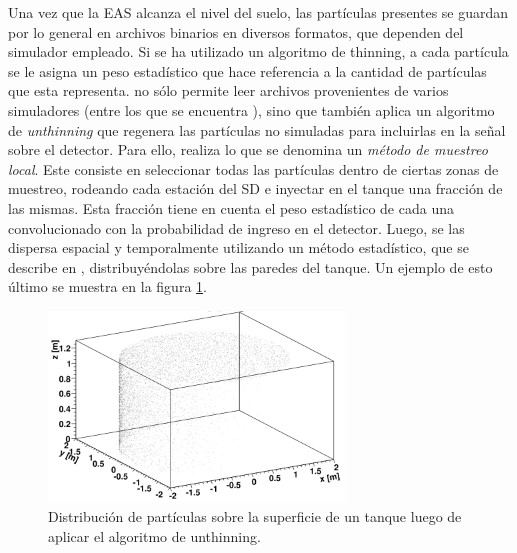		Una vez que la EAS alcanza el nivel del suelo, las part\'iculas presentes se guardan por lo general en archivos binarios en diversos formatos, que dependen del simulador empleado.
		Si se ha utilizado un algoritmo de thinning, a cada part\'icula se le asigna un peso estad\'istico que hace referencia a la cantidad de part\'iculas que esta representa.
		\Offline{} no s\'olo permite leer archivos provenientes de varios simuladores (entre los que se encuentra \aires{}), sino que tambi\'en aplica un algoritmo de \textit{unthinning} que regenera las part\'iculas no simuladas para incluirlas en la se\~nal sobre el detector.
		Para ello, realiza lo que se denomina un \textit{m\'etodo de muestreo local}.
		Este consiste en seleccionar todas las part\'iculas dentro de ciertas zonas de muestreo, rodeando cada estaci\'on del SD e inyectar en el tanque una fracci\'on de las mismas.
		Esta fracci\'on tiene en cuenta el peso estad\'istico de cada una convolucionado con la probabilidad de ingreso en el detector.
		Luego, se las dispersa espacial y temporalmente utilizando un m\'etodo estad\'istico, que se describe en \cite{unthinning1}, distribuy\'endolas sobre las paredes del tanque.
		Un ejemplo de esto \'ultimo se muestra en la figura \ref{fig:unthinning_tank}.
		\begin{figure}[h!]
			\begin{center}
			\includegraphics[width=0.7\textwidth]{fig/simulacionAuger/unthinning_tank}
			\caption{Distribuci\'on de part\'iculas sobre la superficie de un tanque luego de aplicar el algoritmo de unthinning.}
			\label{fig:unthinning_tank}
			\end{center}
		\end{figure}
		
